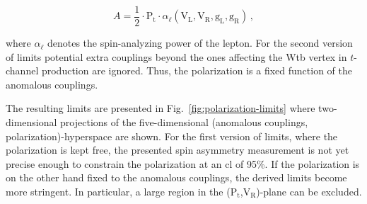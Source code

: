 \begin{equation}
A=\frac{1}{2}\cdot\mathrm{P}_\mathrm{t}\cdot\alpha_{\ell}(\mathrm{V}_\mathrm{L},\mathrm{V}_\mathrm{R},\mathrm{g}_\mathrm{L},\mathrm{g}_\mathrm{R})\,,
\end{equation}

where $\alpha_{\ell}$ denotes the spin-analyzing power of the lepton. For the second version of limits potential extra couplings beyond the ones affecting the Wtb vertex in $t$-channel production are ignored. Thus, the polarization is a fixed function of the anomalous couplings. 

The resulting limits are presented in Fig.~\ref{fig:polarization-limits} where two-dimensional projections of the five-dimensional (anomalous couplings, polarization)-hyperspace are shown. For the first version of limits, where the polarization is kept free, the presented spin asymmetry measurement is not yet precise enough to constrain the polarization at an \acrfull{cl} of 95\%. If the polarization is on the other hand fixed to the anomalous couplings, the derived limits become more stringent. In particular, a large region in the ($\mathrm{P}_\mathrm{t}$,$\mathrm{V}_\mathrm{R}$)-plane can be excluded.



